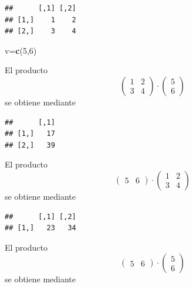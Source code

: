 \documentclass[]{book}
\newenvironment{Shaded}{\begin{snugshade}}{\end{snugshade}}
\newcommand{\DecValTok}[1]{\textcolor[rgb]{0.00,0.00,0.81}{#1}}
\newcommand{\KeywordTok}[1]{\textcolor[rgb]{0.13,0.29,0.53}{\textbf{#1}}}
\newcommand{\NormalTok}[1]{#1}
\newcommand{\OperatorTok}[1]{\textcolor[rgb]{0.81,0.36,0.00}{\textbf{#1}}}
\theoremstyle{definition}
\theoremstyle{definition}
\theoremstyle{definition}
\theoremstyle{remark}
\begin{document}
\begin{verbatim}
##      [,1] [,2]
## [1,]    1    2
## [2,]    3    4
\end{verbatim}

\begin{Shaded}
\begin{Highlighting}[]
\NormalTok{v=}\KeywordTok{c}\NormalTok{(}\DecValTok{5}\NormalTok{,}\DecValTok{6}\NormalTok{)}
\end{Highlighting}
\end{Shaded}

El producto
\[
\left(\begin{array}{cc}
1 & 2 \\ 3 & 4\end{array}
\right)\cdot \left(\begin{array}{c}
5\\ 6\end{array}
\right)
\]
se obtiene mediante

\begin{Shaded}
\end{Shaded}

\begin{verbatim}
##      [,1]
## [1,]   17
## [2,]   39
\end{verbatim}

El producto
\[
\left(\begin{array}{cc}
5 & 6\end{array}\right)\cdot\left(\begin{array}{cc}
1 & 2 \\ 3 & 4\end{array}
\right)
\]
se obtiene mediante

\begin{Shaded}
\end{Shaded}

\begin{verbatim}
##      [,1] [,2]
## [1,]   23   34
\end{verbatim}

El producto
\[
\left(\begin{array}{cc}
5 & 6\end{array}\right)\cdot \left(\begin{array}{c}
5\\ 6\end{array}
\right)
\]
se obtiene mediante
\end{document}
